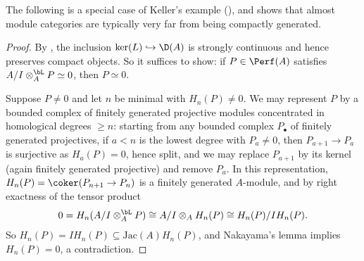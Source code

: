 
	The following is a special case of Keller's example (), and shows that almost module categories are typically very far from being compactly generated.

	\begin{proof}
		By , the inclusion $\ker(L) \hookrightarrow \D(A)$ is strongly continuous and hence preserves compact objects. So it suffices to show: if $P \in \Perf(A)$ satisfies $A/I \otimes^{\bL}_A P \simeq 0$, then $P \simeq 0$.

		Suppose $P \neq 0$ and let $n$ be minimal with $H_n(P) \neq 0$. We may represent $P$ by a bounded complex of finitely generated projective modules concentrated in homological degrees $\geq n$: starting from any bounded complex $P_\bullet$ of finitely generated projectives, if $a < n$ is the lowest degree with $P_a \neq 0$, then $P_{a+1} \to P_a$ is surjective as $H_a(P) = 0$, hence split, and we may replace $P_{a+1}$ by its kernel (again finitely generated projective) and remove $P_a$. In this representation, $H_n(P) = \coker(P_{n+1} \to P_n)$ is a finitely generated $A$-module, and by right exactness of the tensor product
		\[
			0 = H_n(A/I \otimes^{\bL}_A P) \cong A/I \otimes_A H_n(P) \cong H_n(P)/IH_n(P).
		\]
		So $H_n(P) = IH_n(P) \subseteq \mathrm{Jac}(A)H_n(P)$, and Nakayama's lemma implies $H_n(P) = 0$, a contradiction.
	\end{proof}


